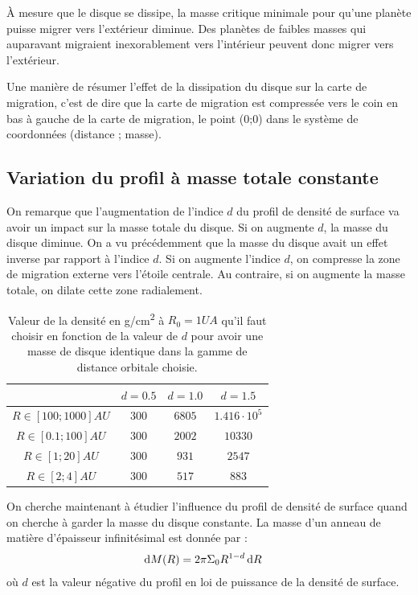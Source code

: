 À mesure que le disque se dissipe, la masse critique minimale pour qu'une planète puisse migrer vers l'extérieur diminue. Des planètes de faibles masses qui auparavant migraient inexorablement vers l'intérieur peuvent donc migrer vers l'extérieur. 

Une manière de résumer l'effet de la dissipation du disque sur la carte de migration, c'est de dire que la carte de migration
est compressée vers le coin en bas à gauche de la carte de migration, le point (0;0) dans le système de coordonnées (distance ;
masse).

\subsection{Variation du profil à masse totale constante}
On remarque que l'augmentation de l'indice $d$ du profil de densité de surface va avoir un impact sur la masse totale du
disque. Si on augmente $d$, la masse du disque diminue. On a vu précédemment que la masse du disque avait un effet inverse par rapport à l'indice $d$. Si on augmente
l'indice $d$, on compresse la zone de migration externe vers l'étoile centrale. Au contraire, si on augmente la masse totale, on
dilate cette zone radialement. 

\begin{table}[htbp]
\centering
\begin{tabular}{|c|c|c|c|}
\hline 
 & $d=0.5$ & $d=1.0$ & $d=1.5$ \\\hline 
$R\in[100 ; 1000]\unit{AU}$ & $300$ & $6805$ & $1.416\cdot 10^5$ \\ \hline 
$R\in[0.1 ; 100]\unit{AU}$ & $300$ & $2002$ & $10330$ \\ \hline 
$R\in[1 ; 20]\unit{AU}$ & $300$ & $931$ & $2547$ \\ \hline 
$R\in[2 ; 4]\unit{AU}$ & $300$ & $517$ & $883$ \\ \hline 
\end{tabular} 
\caption{Valeur de la densité en \unit{g/cm^2} à $R_0=1\unit{UA}$ qu'il faut choisir en fonction de la valeur de $d$ pour avoir une masse de disque identique dans la gamme de distance orbitale choisie.}\label{tab:profils_equivalents}
\end{table}

On cherche maintenant à étudier l'influence du profil de densité de surface quand on cherche à garder la masse du disque constante. La masse d'un anneau de matière d'épaisseur infinitésimal est donnée par : 
\begin{align}
\operatorname{d \!} M(R) &= 2\pi \Sigma_0 R^{1-d} \operatorname{d \!} R
\end{align}
où $d$ est la valeur négative du profil en loi de puissance de la densité de surface. 

